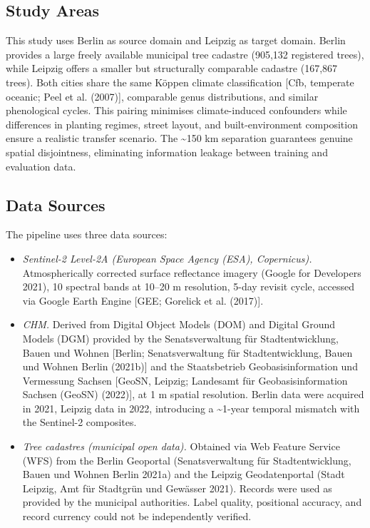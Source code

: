 \documentclass[11pt,a4paper]{scrartcl}
\providecommand{\tightlist}{}
\begin{document}
\subsection{Study Areas}\label{study-areas}

This study uses Berlin as source domain and Leipzig as target domain.
Berlin provides a large freely available municipal tree cadastre
(905,132 registered trees), while Leipzig offers a smaller but
structurally comparable cadastre (167,867 trees). Both cities share the
same Köppen climate classification {[}Cfb, temperate oceanic; Peel et
al. (2007){]}, comparable genus distributions, and similar phenological
cycles. This pairing minimises climate-induced confounders while
differences in planting regimes, street layout, and built-environment
composition ensure a realistic transfer scenario. The \textasciitilde150
km separation guarantees genuine spatial disjointness, eliminating
information leakage between training and evaluation data.

\FloatBarrier

\subsection{Data Sources}\label{data-sources}

The pipeline uses three data sources:

\begin{itemize}
\tightlist
\item
  \emph{Sentinel-2 Level-2A (European Space Agency (ESA), Copernicus).}
  Atmospherically corrected surface reflectance imagery (Google for
  Developers 2021), 10 spectral bands at 10--20 m resolution, 5-day
  revisit cycle, accessed via Google Earth Engine {[}GEE; Gorelick et
  al. (2017){]}.
\item
  \emph{CHM.} Derived from Digital Object Models (DOM) and Digital
  Ground Models (DGM) provided by the Senatsverwaltung für
  Stadtentwicklung, Bauen und Wohnen {[}Berlin; Senatsverwaltung für
  Stadtentwicklung, Bauen und Wohnen Berlin (2021b){]} and the
  Staatsbetrieb Geobasisinformation und Vermessung Sachsen {[}GeoSN,
  Leipzig; Landesamt für Geobasisinformation Sachsen (GeoSN) (2022){]},
  at 1 m spatial resolution. Berlin data were acquired in 2021, Leipzig
  data in 2022, introducing a \textasciitilde1-year temporal mismatch
  with the Sentinel-2 composites.
\item
  \emph{Tree cadastres (municipal open data).} Obtained via Web Feature
  Service (WFS) from the Berlin Geoportal (Senatsverwaltung für
  Stadtentwicklung, Bauen und Wohnen Berlin 2021a) and the Leipzig
  Geodatenportal (Stadt Leipzig, Amt für Stadtgrün und Gewässer 2021).
  Records were used as provided by the municipal authorities. Label
  quality, positional accuracy, and record currency could not be
  independently verified.
\end{itemize}
\end{document}
